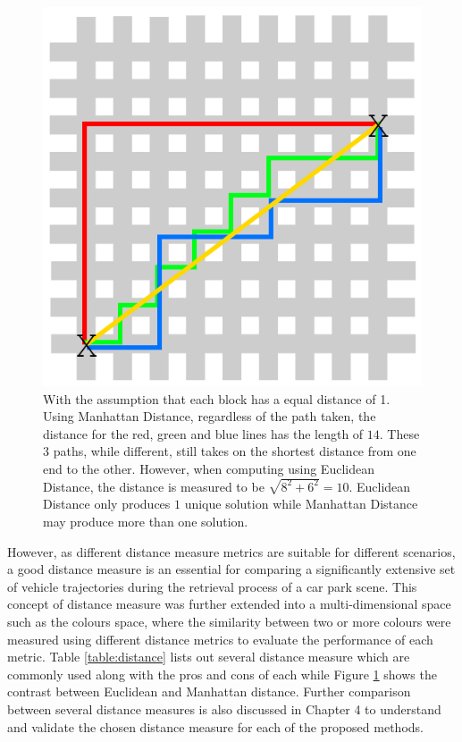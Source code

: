 \begin{figure}[hbt!]\centering
\includegraphics[width=.5\textwidth]{image/lit/manhattan.png}
\caption[Comparison between Manhattan Distance vs. Euclidean Distance]{With the assumption that each block has a equal distance of 1. Using Manhattan Distance, regardless of the path taken, the distance for the red, green and blue lines has the length of $14$. These 3 paths, while different, still takes on the shortest distance from one end to the other. However, when computing using Euclidean Distance, the distance is measured to be $\sqrt{8^2+6^2} = 10$. Euclidean Distance only produces $1$ unique solution while Manhattan Distance may produce more than one solution.}
\label{fig:manhattan}
\end{figure}


However, as different distance measure metrics are suitable for different scenarios, a good distance measure is an essential for comparing a significantly extensive set of vehicle trajectories during the retrieval process of a car park scene. This concept of distance measure was further extended into a multi-dimensional space such as the colours space, where the similarity between two or more colours were measured using different distance metrics to evaluate the performance of each metric. Table \ref{table:distance} lists out several distance measure which are commonly used along with the pros and cons of each while Figure \ref{fig:manhattan} shows the contrast between Euclidean and Manhattan distance.
Further comparison between several distance measures is also discussed in Chapter 4 to understand and validate the chosen distance measure for each of the proposed methods.

